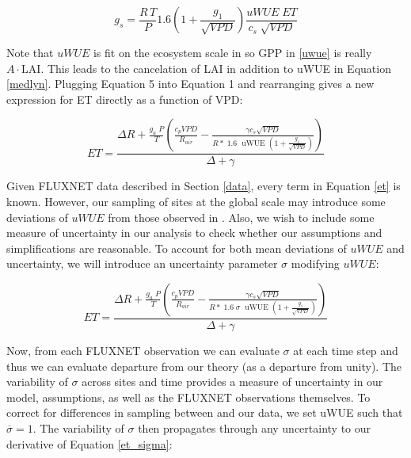 \documentclass[draft,linenumbers]{agujournal}
\begin{document}
\begin{linenomath*}
  \begin{equation}
  g_s = \frac{R \, T}{P} 1.6 \left(1 + \frac{g_1}{\sqrt{VPD}}\right) \frac{uWUE \; ET}{c_s \; \sqrt{VPD}}
  \end{equation}
\end{linenomath*}

Note that $uWUE$ is fit on the ecosystem scale in \citet{Zhou_2015} so GPP in \ref{uwue} is really $A\cdot \text{LAI}$. This leads to the cancelation of LAI in addition to uWUE in Equation \ref{medlyn}. Plugging Equation 5 into Equation 1 and rearranging gives a new expression for ET directly as a function of VPD:

\begin{linenomath*}
  \begin{equation}
    ET = \frac{\Delta R + \frac{g_a\; P}{T} \left( \frac{ c_p VPD}{R_{air}} -  \frac{\gamma c_s \sqrt{VPD} }{ R* \; 1.6\; \text{ uWUE } (1 + \frac{g_1}{\sqrt{VPD}})} \right) }{ \Delta + \gamma}
    \label{et}
  \end{equation}
\end{linenomath*}

Given FLUXNET data described in Section \ref{data}, every term in Equation \ref{et} is known. However, our sampling of sites at the global scale may introduce some deviations of $uWUE$ from those observed in \citet{Zhou_2015}. Also, we wish to include some measure of uncertainty in our analysis to check whether our assumptions and simplifications are reasonable. To account for both mean deviations of $uWUE$ and uncertainty, we will introduce an uncertainty parameter $\sigma$ modifying $uWUE$:

\begin{linenomath*}
  \begin{equation}
    ET = \frac{\Delta R + \frac{g_a\; P}{T} \left( \frac{ c_p VPD}{R_{air}} -  \frac{\gamma c_s \sqrt{VPD} }{ R* \; 1.6\; \sigma \; \text{ uWUE } (1 + \frac{g_1}{\sqrt{VPD}})} \right) }{ \Delta + \gamma}
    \label{et_sigma}
  \end{equation}
\end{linenomath*}

Now, from each FLUXNET observation we can evaluate $\sigma$ at each time step and thus we can evaluate departure from our theory (as a departure from unity). The variability of $\sigma$ across sites and time provides a measure of uncertainty in our model, assumptions, as well as the FLUXNET observations themselves. To correct for differences in sampling between \cite{Zhou_2015} and our data, we set uWUE such that $\overline{\sigma} = 1$. The variability of $\sigma$ then propagates through any uncertainty to our derivative of Equation \ref{et_sigma}:
\end{document}
